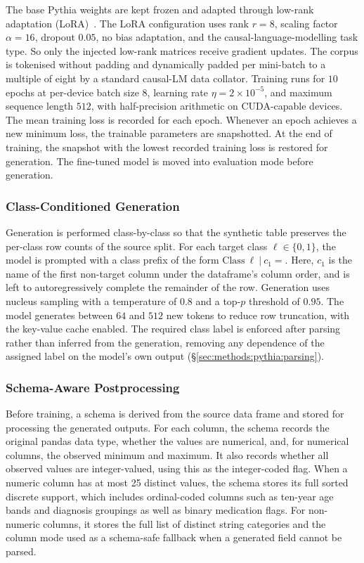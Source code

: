 The base Pythia weights are kept frozen and adapted through low-rank
adaptation (LoRA)~\cite{Hu2022LoRA}. The LoRA configuration uses rank
$r = 8$, scaling factor $\alpha = 16$, dropout $0.05$, no bias
adaptation, and the causal-language-modelling task type. So only
the injected low-rank matrices receive gradient updates. The corpus is
tokenised without padding and dynamically padded per mini-batch to a
multiple of eight by a standard causal-LM data collator. 
Training runs for $10$ epochs at per-device batch size $8$,
learning rate $\eta = 2 \times 10^{-5}$, and maximum sequence length
$512$, with half-precision arithmetic on CUDA-capable devices. The 
mean training loss is recorded for each epoch. Whenever an epoch 
achieves a new minimum loss, the trainable parameters are snapshotted. 
At the end of training, the snapshot with the lowest recorded training
loss is restored for generation. The
fine-tuned model is moved into evaluation mode before generation.

\subsubsection{Class-Conditioned Generation}
\label{sec:methods:pythia:generation}

Generation is performed class-by-class so that the synthetic table
preserves the per-class row counts of the source split. For each
target class $\ell \in \{0, 1\}$, the model is prompted with a class
prefix of the form $\mathrm{Class}\ \ell ~|~ c_1 =$. Here, $c_1$ is
the name of the first non-target column under the dataframe's column
order, and is left to autoregressively complete the remainder of the
row. Generation uses nucleus sampling with a temperature of $0.8$ and a
top-$p$ threshold of $0.95$. The model generates between $64$ and $512$
new tokens to reduce row truncation, with the key-value cache enabled. 
The required class label is enforced after parsing
rather than inferred from the generation, removing any dependence of
the assigned label on the model's own output
(\S\ref{sec:methods:pythia:parsing}).

\subsubsection{Schema-Aware Postprocessing}
\label{sec:methods:pythia:schema}
\label{sec:methods:pythia:parsing}

Before training, a schema is derived from the source data frame and
stored for processing the generated outputs. For each column, the schema
records the original pandas data type, whether the values are numerical,
and, for numerical columns, the observed minimum and maximum. It also records 
whether all observed values are integer-valued, using this as the 
integer-coded flag. When a numeric column has at most 25 distinct values, 
the schema stores its full sorted discrete support, which includes 
ordinal-coded columns such as ten-year age bands and diagnosis 
groupings as well as binary medication 
flags. For non-numeric columns, it stores the full list of distinct string 
categories and the column mode used as a schema-safe fallback when a generated 
field cannot be parsed.

